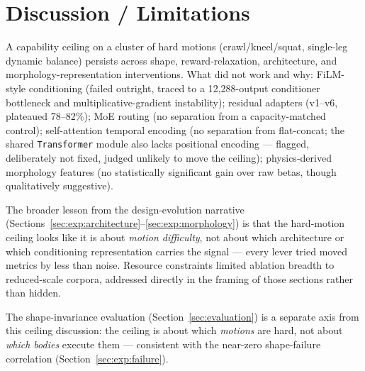 \section{Discussion / Limitations}
\label{sec:discussion}

A capability ceiling on a cluster of hard motions (crawl/kneel/squat, single-leg dynamic balance)
persists across shape, reward-relaxation, architecture, and morphology-representation
interventions. What did not work and why: FiLM-style conditioning (failed outright, traced to a
12{,}288-output conditioner bottleneck and multiplicative-gradient instability); residual adapters
(v1--v6, plateaued 78--82\%); MoE routing (no separation from a capacity-matched control);
self-attention temporal encoding (no separation from flat-concat; the shared \texttt{Transformer}
module also lacks positional encoding — flagged, deliberately not fixed, judged unlikely to move
the ceiling); physics-derived morphology features (no statistically significant gain over raw
betas, though qualitatively suggestive).

The broader lesson from the design-evolution narrative
(Sections~\ref{sec:exp:architecture}--\ref{sec:exp:morphology}) is that the hard-motion ceiling
looks like it is about \emph{motion difficulty}, not about which architecture or which
conditioning representation carries the signal — every lever tried moved metrics by less than
noise. Resource constraints limited ablation breadth to reduced-scale corpora, addressed directly
in the framing of those sections rather than hidden.

The shape-invariance evaluation (Section~\ref{sec:evaluation}) is a separate axis from this
ceiling discussion: the ceiling is about which \emph{motions} are hard, not about \emph{which
bodies} execute them — consistent with the near-zero shape-failure correlation
(Section~\ref{sec:exp:failure}).
